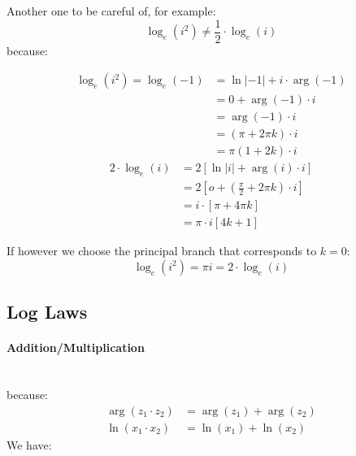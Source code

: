 \documentclass[class=article, crop=false]{standalone}
\begin{document}
      Another one to be careful of, for example:
      \[
        \log_e{\left( i^2 \right) }\neq \frac{1}{2} \cdot \log_e{\left( i \right) }
      \]
      because:
      \begin{multicols}{2}
        \begin{align*}
         \log_e{\left( i^2 \right) } =  \log_e{\left(  - 1 \right) } &= \ln{      \left|  - 1 \right|  } +  i \cdot  \operatorname{arg}\left( - 1 \right) \\
         &=  0 +  \operatorname{arg}\left( - 1 \right) \cdot i\\
         &=  \operatorname{arg}\left( - 1 \right) \cdot i\\
         &= \left( \pi +  2 \pi k \right) \cdot  i\\
         &=  \pi \left(1 +  2k \right) \cdot i
        \end{align*}\break
        \begin{align*}
          2\cdot \log_e{\left( i \right) }&= 2\left[ \ln{     \left| i \right|  }+ \operatorname{arg}\left( i \right) \cdot i \right] \\
          &= 2\left[ o +  \left( \frac{\pi}{2} +  2 \pi k \right) \cdot i \right] \\
          &= i \cdot  \left[  \pi +  4 \pi k \right] \\
          &= \pi\cdot i \left[ 4k+ 1 \right]
        \end{align*}
      \end{multicols}

      If however we choose the principal branch that corresponds to $k =  0$:
      \[
      \log_e{\left( i^2 \right) } = \pi i =  2 \cdot \log_e{\left( i \right) }
      \]



      \newpage

\subsection{Log Laws}
\paragraph{Addition/Multiplication}\ \\
because:
\begin{align*}
\operatorname{arg}\left( z_1 \cdot z_2 \right) &= \operatorname{arg} \left( z_1 \right) +  \operatorname{arg}\left( z_2 \right) \\
\ln{ \left( x_1 \cdot  x_2 \right)  } &=  \ln{ \left( x_1 \right)  }+  \ln{  \left( x_2 \right)  }
\end{align*}
We have:
\ \
\end{document}
